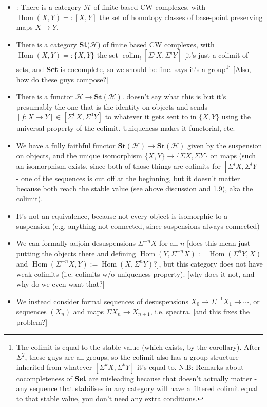 \documentclass{MetricNotes2023}
\DeclareMathOperator{\colim}{colim}
\DeclareMathOperator{\Hom}{Hom}
\begin{document}
\begin{itemize}
\item \autocite{ass}: There is a category \(\mathcal{H}\) of finite %
based CW  complexes, with \(\Hom(X, Y)=:[X, Y]\) the set of homotopy classes of base-point preserving maps \(X\to Y\).
\item There is a category \textbf{St}(\(\mathcal{H}\)) of finite based CW complexes, with \(\Hom(X, Y)=:\{X, Y\}\) the  set \(\colim_i [\Sigma^iX, \Sigma^iY]\) [it's just a colimit of sets, and \textbf{Set} is cocomplete, so we should be fine. \autocite{ass} says it's a group\footnote{The colimit is equal to the stable value (which exists, by the corollary). After \(\Sigma^2\), these guys are all groups, so the colimit also has a group structure inherited from whatever \([\Sigma^k X, \Sigma^k Y]\) it's equal to. N.B: Remarks about cocompleteness of \textbf{Set} are misleading because that doesn't actually matter - any sequence that stabilises in any category will have a filtered colimit equal to that stable value, you don't need any extra conditions.}] [Also, how do these guys compose?]
\item There is a functor \(\mathcal{H}\to \textbf{St}(\mathcal{H})\). \autocite{ass} doesn't say what this is but it's presumably the one that is the identity on objects and sends \([f : X \to Y]\in [\Sigma^0X, \Sigma^0Y]\) to whatever it gets sent to in \(\{X, Y\}\) using the universal property of the colimit. Uniqueness makes it functorial, etc.
\item We have a fully faithful functor \(\textbf{St}(\mathcal{H})\to \textbf{St}(\mathcal{H})\) given by the suspension on objects, and the unique isomorphism \(\{X, Y\}\to\{\Sigma X, \Sigma Y\}\) on maps (such an isomorphism exists, since both of those things are colimits for \([\Sigma^i X, \Sigma^i Y]\) - one of the sequences is cut off at the beginning, but it doesn't matter because both reach the stable value (see above discussion and \autocite{ass} 1.9), aka the colimit). 
\item It's not an equivalence, because not every object is isomorphic to a suspension (e.g. anything not connected, since suspensions always connected)
\item We can formally adjoin desuspensions \(\Sigma^{-n}X\) for all \(n\) [does this mean just putting the objects there and defining \(\Hom(Y, \Sigma^{-n}X):=\Hom(\Sigma^nY, X)\) and \(\Hom(\Sigma^{-n}X, Y):=\Hom(X, \Sigma^n Y)\)?], but this category does not have weak colimits (i.e. colimits w/o uniqueness property). [why does it not, and why do we even want that?]
\item We instead consider formal sequences of desuspensions \(X_0 \to \Sigma^{-1}X_1 \to \cdots\), or sequences \((X_n)\) and maps \(\Sigma X_n \to X_{n+1}\), i.e. spectra. [and this fixes the problem?]
\end{itemize}
\end{document}
